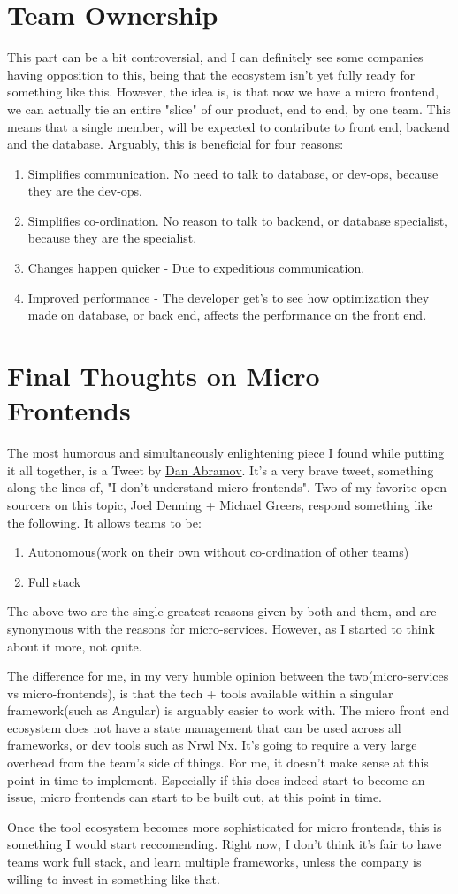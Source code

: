 \section{Team Ownership}
This part can be a bit controversial, and I can definitely see some companies having opposition to this, being that the ecosystem isn't yet fully ready for something like this. However, the idea is, is that now we have a micro frontend, we can actually tie an entire "slice" of our product, end to end, by one team. This means that a single member, will be expected to contribute to front end, backend and the database. Arguably, this is beneficial for four reasons: 
\begin{enumerate}
  \item Simplifies communication. No need to talk to database, or dev-ops, because they are the dev-ops. 
  \item Simplifies co-ordination. No reason to talk to backend, or database specialist, because they are the specialist. 
  \item Changes happen quicker - Due to expeditious communication.
  \item Improved performance - The developer get's to see how optimization they made on database, or back end, affects the performance on the front end. 
\end{enumerate}

\section{Final Thoughts on Micro Frontends}
The most humorous and simultaneously enlightening piece I found while putting it all together, is a Tweet by \href{twitter.com/dan_abramov/status/1132493678730252288?s=20}{Dan Abramov}. It's a very brave tweet, something along the lines of, "I don't understand micro-frontends". Two of my favorite open sourcers on this topic, Joel Denning + Michael Greers, respond something like the following. It allows teams to be:
\begin{enumerate}
  \item Autonomous(work on their own without co-ordination of other teams)
  \item Full stack
\end{enumerate}

The above two are the single greatest reasons given by both and them, and are synonymous with the reasons for micro-services. However, as I started to think about it more, not quite. 

The difference for me, in my very humble opinion between the two(micro-services vs micro-frontends), is that the tech + tools available within a singular framework(such as Angular) is arguably easier to work with. The micro front end ecosystem does not have a state management that can be used across all frameworks, or dev tools such as Nrwl Nx. It's going to require a very large overhead from the team's side of things. For me, it doesn't make sense at this point in time to implement. Especially if this does indeed start to become an issue, micro frontends can start to be built out, at this point in time. 

Once the tool ecosystem becomes more sophisticated for micro frontends, this is something I would start reccomending. Right now, I don't think it's fair to have teams work full stack, and learn multiple frameworks, unless the company is willing to invest in something like that.
